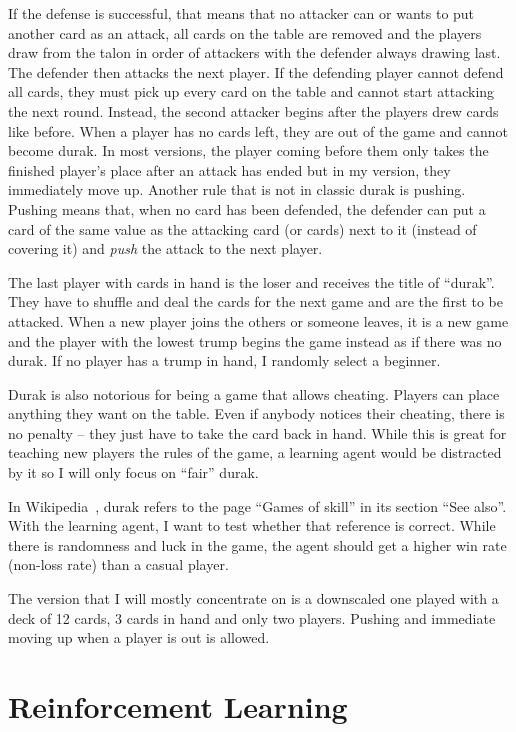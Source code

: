 \documentclass[a4paper,titlepage]{article}
\begin{document}
If the defense is successful, that means that no attacker can or wants to put another card as an attack, all cards on the table are removed and the players draw from the talon in order of attackers with the defender always drawing last. The defender then attacks the next player.
If the defending player cannot defend all cards, they must pick up every card on the table and cannot start attacking the next round. Instead, the second attacker begins after the players drew cards like before.
When a player has no cards left, they are out of the game and cannot become durak. In most versions, the player coming before them only takes the finished player's place after an attack has ended but in my version, they immediately move up.
Another rule that is not in classic durak is pushing. Pushing means that, when no card has been defended, the defender can put a card of the same value as the attacking card (or cards) next to it (instead of covering it) and \emph{push} the attack to the next player.

The last player with cards in hand is the loser and receives the title of ``durak''. They have to shuffle and deal the cards for the next game and are the first to be attacked. When a new player joins the others or someone leaves, it is a new game and the player with the lowest trump begins the game instead as if there was no durak. If no player has a trump in hand, I randomly select a beginner. \medskip

Durak is also notorious for being a game that allows cheating. Players can place anything they want on the table. Even if anybody notices their cheating, there is no penalty -- they just have to take the card back in hand. While this is great for teaching new players the rules of the game, a learning agent would be distracted by it so I will only focus on ``fair'' durak.

In Wikipedia~\cite{wikidurak}, durak refers to the page ``Games of skill'' in its section ``See also''. With the learning agent, I want to test whether that reference is correct. While there is randomness and luck in the game, the agent should get a higher win rate (non-loss rate) than a casual player. \medskip

The version that I will mostly concentrate on is a downscaled one played with a deck of 12 cards, 3 cards in hand and only two players.
Pushing and immediate moving up when a player is out is allowed.

\newpage

\section{Reinforcement Learning}
\end{document}
